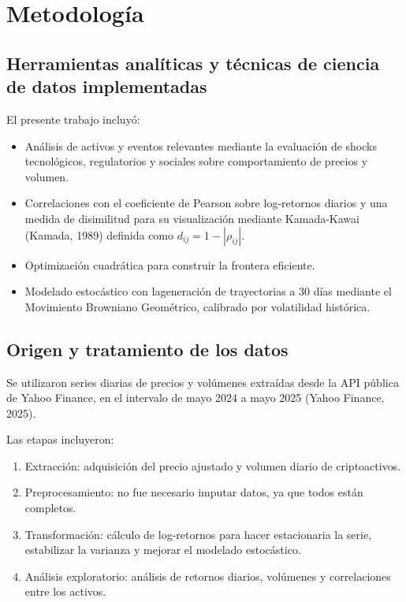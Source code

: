 \documentclass[12pt,letterpaper]{article}   %
\begin{document}
\section{Metodología}
\subsection{Herramientas analíticas y técnicas de ciencia de datos implementadas}
El presente trabajo incluyó:
\begin{itemize}
\item Análisis de activos y eventos relevantes mediante la evaluación de shocks tecnológicos, regulatorios y sociales sobre comportamiento de precios y volumen.
\item Correlaciones con el coeficiente de Pearson sobre log-retornos diarios y una medida de disimilitud para su visualización mediante Kamada-Kawai (Kamada, 1989) definida como $d_{ij}=1-\left|\rho_{ij}\right|$. 
\item Optimización cuadrática para construir la frontera eficiente.
\item Modelado estocástico con lageneración de trayectorias a 30 días mediante el Movimiento Browniano Geométrico, calibrado por volatilidad histórica.
\end{itemize}

\subsection{Origen y tratamiento de los datos}
Se utilizaron series diarias de precios y volúmenes extraídas desde la API pública de Yahoo Finance, en el intervalo de mayo 2024 a mayo 2025 (Yahoo Finance, 2025). 



Las etapas incluyeron:

\begin{enumerate}
\item Extracción: adquisición del precio ajustado y volumen diario de criptoactivos.
\item Preprocesamiento: no fue necesario imputar datos, ya que todos están completos.
\item Transformación: cálculo de log-retornos para hacer estacionaria la serie, estabilizar la varianza y mejorar el modelado estocástico.
\item Análisis exploratorio: análisis de retornos diarios, volúmenes y correlaciones entre los activos.
\end{enumerate}
\end{document}
